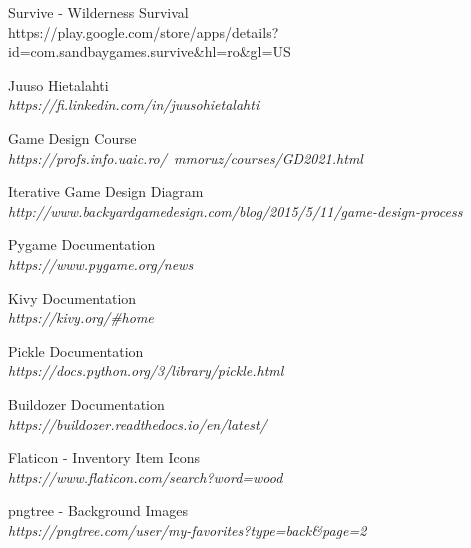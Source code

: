 \begin{thebibliography}{99}

Survive - Wilderness Survival  \\
{https://play.google.com/store/apps/details?id=com.sandbaygames.survive\&hl=ro\&gl=US}

Juuso Hietalahti \\
\textit{https://fi.linkedin.com/in/juusohietalahti}

Game Design Course \\
\textit{https://profs.info.uaic.ro/~mmoruz/courses/GD2021.html}

Iterative Game Design Diagram \\
\textit{http://www.backyardgamedesign.com/blog/2015/5/11/game-design-process}

Pygame Documentation \\
\textit{https://www.pygame.org/news }
 
Kivy Documentation \\
\textit{https://kivy.org/\#home}

Pickle Documentation \\
\textit{https://docs.python.org/3/library/pickle.html}
 
Buildozer Documentation \\
\textit{https://buildozer.readthedocs.io/en/latest/}

Flaticon - Inventory Item Icons \\
\textit{https://www.flaticon.com/search?word=wood}
 
pngtree - Background Images \\
\textit{https://pngtree.com/user/my-favorites?type=back\&page=2}
 
\end{thebibliography}